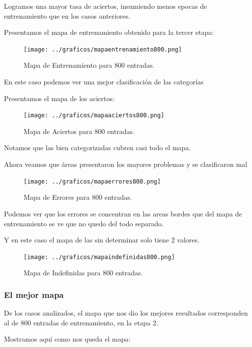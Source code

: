 Logramos una mayor tasa de aciertos, insumiendo menos epocas de entrenamiento
que en los casos anteriores.

Presentamos el mapa de entrenamiento obtenido para la tercer etapa:

\begin{figure}[H]
  \centering
  \texttt{[image: ../graficos/mapaentrenamiento800.png]}
  \caption{Mapa de Entrenamiento para 800 entradas.}
  \label{fig:mapa train 800}
\end{figure}

En este caso podemos ver una mejor clasificación de las categorías

Presentamos el mapa de los aciertos:

\begin{figure}[H]
  \centering
  \texttt{[image: ../graficos/mapaaciertos800.png]}
  \caption{Mapa de Aciertos para 800 entradas.}
  \label{fig:mapa aciertos 800}
\end{figure}

Notamos que las bien categorizadas cubren casi todo el mapa.

Ahora veamos que áreas presentaron los mayores problemas y se clasificaron mal

\begin{figure}[H]
  \centering
  \texttt{[image: ../graficos/mapaerrores800.png]}
  \caption{Mapa de Errores para 800 entradas.}
  \label{fig:mapa errores 800}
\end{figure}

Podemos ver que los errores se concentran en las areas bordes que del mapa
de entrenamiento se ve que no quedo del todo separado.

Y en este caso el mapa de las sin determinar solo tiene 2 valores.


\begin{figure}[H]
  \centering
  \texttt{[image: ../graficos/mapaindefinidas800.png]}
  \caption{Mapa de Indefinidas para 800 entradas.}
  \label{fig:mapa indefinidas 800}
\end{figure}


\subsubsection{El mejor mapa}

De los casos analizados, el mapa que nos dio los mejores resultados corresponden
al de 800 entradas de entrenamiento, en la etapa 2.

Mostramos aquí como nos queda el mapa:

